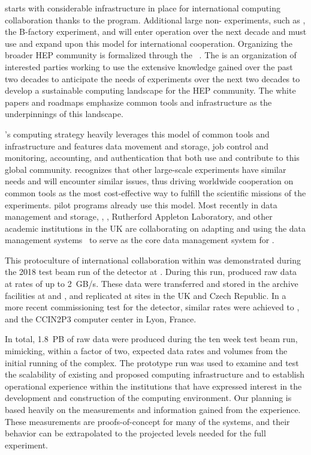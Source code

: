  starts with considerable infrastructure in place for international computing collaboration thanks to the  program.  Additional large non- experiments,  such as , the  B-factory experiment, and   will enter operation over the next decade and must use and expand upon this model for international cooperation.  Organizing the broader HEP community is formalized through the ~\cite{Alves:2017she}.  The  is an organization of interested parties working to use the extensive knowledge gained over the past two decades to anticipate the needs of experiments   over the next two decades to develop a sustainable computing landscape for the HEP community.  The  white papers and roadmaps emphasize common tools and infrastructure as the underpinnings of this landscape.

's computing strategy heavily leverages this model of common tools and infrastructure and features data movement and storage, job control and monitoring, accounting, and authentication that both use and contribute to this global community.    recognizes that other large-scale experiments have similar needs and will encounter similar issues, thus driving worldwide cooperation on common tools as the most cost-effective way to fulfill the scientific missions of the experiments.   pilot programs already use this model.  Most recently in data management and storage, , , Rutherford Appleton Laboratory, and other academic institutions in the %
UK are collaborating on adapting and using the  data management systems~\cite{Barisits:2019fyl}  to serve as the core data management system for .

This protoculture of international collaboration within  %
was demonstrated during the 2018 test beam run of the  detector  at .  During this run, %
 produced raw data at rates of up to \SI{2}{GB/s}.  These data were transferred and stored in the archive facilities at  and , and replicated at sites in the UK and Czech Republic.  In a more recent commissioning test for the  detector, similar rates %
were achieved to ,  and the CCIN2P3 computer center in Lyon, France.

In total, \SI{1.8}{PB} of raw data were produced during the ten week test beam run, mimicking, within a factor of two, expected data rates and volumes from the initial running of the  complex.  The prototype run was used to examine and test the scalability of existing and proposed computing infrastructure and to establish operational experience within the institutions that have expressed interest in the development and construction of the  computing environment.  Our planning is based heavily on the measurements and information gained from the  experience.   These measurements are proofs-of-concept for many of the systems, and their behavior can be extrapolated to the projected levels needed for the full  experiment. 


